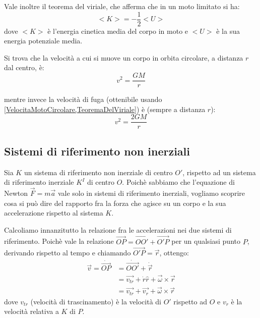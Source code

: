 \documentclass[../main.tex]{subfiles}
\begin{document}
Vale inoltre il teorema del viriale, che afferma che in un moto limitato si ha:
\begin{equation} \label{TeoremaDelViriale}
	<K>=-\frac{1}{2}<U>
\end{equation}
dove $<K>$ è l'energia cinetica media del corpo in moto e $<U>$ è la sua energia potenziale media.

Si trova che la velocità a cui si muove un corpo in orbita circolare, a distanza $r$ dal centro, è:
\begin{equation} \label{VelocitaMotoCircolare}
	v^2=\frac{GM}{r}
\end{equation}

mentre invece la velocità di fuga (ottenibile usando \cref{VelocitaMotoCircolare,TeoremaDelViriale}) è (sempre a distanza $r$):
\begin{equation} \label{VelocitaDiFuga}
	v^2=\frac{2GM}{r}
\end{equation}




\subsection{Sistemi di riferimento non inerziali}
Sia $K$ un sistema di riferimento non inerziale di centro $O'$, rispetto ad un sistema di riferimento
inerziale $K^I$ di centro $O$. Poichè sabbiamo che l'equazione di Newton $\vec{F}=m\vec{a}$
vale solo in sistemi di riferimento inerziali, vogliamo scoprire cosa si può dire del rapporto fra la forza
che agisce su un corpo e la sua accelerazione rispetto al sistema $K$.

Calcoliamo innanzitutto la relazione fra le accelerazioni nei due sistemi di riferimento. Poichè vale la
relazione $\overrightarrow{OP}=\overrightarrow{OO'}+\overrightarrow{O'P}$ per un qualsiasi punto $P$, derivando 
rispetto al tempo e chiamando $\overrightarrow{O'P}=\vec{r}$, ottengo:
\begin{equation}\label{VelNonInerziale}
\begin{split}
	\vec{v}=\dot{\overrightarrow{OP}}	& =\dot{\overrightarrow{OO'}}+\dot{\vec{r}}\\
													& =\overrightarrow{v_{tr}}+\dot{r}\hat{r}+\vec{\omega}\times\vec{r}\\
													& =\overrightarrow{v_{tr}}+\vec{v_r}+\vec{\omega}\times\vec{r}
\end{split}
\end{equation}
dove $v_{tr}$ (velocità di trascinamento) è la velocità di $O'$ rispetto ad $O$ e $v_r$ è la velocità relativa
a $K$ di $P$.
\end{document}
